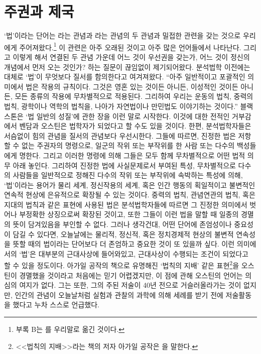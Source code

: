 \chapter{주권과 제국}

`법'이라는 단어는
라는 관념과
라는 관념의 두 관념과 밀접한 관련을 갖는 것으로
우리에게 주어져왔다.\footnote{%
  부록 B는 를
  우리말로 옮긴 것이다. }
이 관련은 아주 오래된 것이고
아주 많은 언어들에서 나타난다.
그리고 이렇게 해서 연결된 두 관념 가운데
어느 것이 우선권을 갖는가,
어느 것이 정신의 개념에서 먼저 오는 것인가?
하는 질문이 끊임없이 제기되어왔다.
분석법학 이전에는 대체로
`법'이 무엇보다 질서를 함의한다고 여겨져왔다.
``아주 일반적이고 포괄적인 의미에서 법은 작용의 규칙이다.
그것은 영혼 있는 것이든 아니든,
이성적인 것이든 아니든,
모든 종류의 작용에 무차별적으로 적용된다.
그리하여 우리는 운동의 법칙, 중력의 법칙, 광학이나 역학의 법칙을,
나아가 자연법이나 만민법도 이야기하는 것이다.''
블랙스톤은 `법 일반의 성질'에 관한 장을 이런 말로 시작한다.
이것에 대한 전적인 거부감에서
벤담과 오스틴은 법학자가 되었다고
할 수도 있을 것이다.
한편, 분석법학자들은 서슴없이 힘의 관념을 질서의 관념보다 우선시한다.
그들에 따르면,
진정한 법은 저항할 수 없는 주권자의 명령으로,
일군의 작위 또는 부작위를 한 사람 또는 다수의 백성들에게 명한다.
그리고
이러한 명령에 의해 그들은
모두 함께 무차별적으로
어떤 법적 의무 아래 놓인다.
그리하여
진정한 법에
사실문제로서
부여된 특성,
무차별적으로
다수의 사람들을
일반적으로 정해진
다수의 작위 또는 부작위에 속박하는 특성에 의해,
`법'이라는 용어가
물리 세계, 정신작용의 세계, 혹은 인간 행동의
획일적이고 불변적인 연속적 현상에
은유적으로 확장될 수 있는 것이다.
중력의 법칙, 관념연관의 법칙, 혹은 지대의 법칙과 같은 표현에 사용된
법은 분석법학자들에 따르면
그 진정한 의미에서 벗어나 부정확한 상징으로써 확장된 것이고,
또한 그들이 이런 법을 말할 때 일종의 경멸의 뜻이 담겨있음을 부인할 수 없다.
그러나 생각건대,
어떤 단어에 존엄성이나 중요성이 담길 수 있다면,
오늘날에는 물리적, 정신적, 혹은 정치경제적 현상의 불변적 연속성을
뜻할 때의 법이라는 단어보다 더 존엄하고 중요한 것이 또 있을까 싶다.
이런 의미에서의 `법'은 대부분의 근대사상에 들어와있고,
근대사상이 수행되는 조건이 되었다고 할 수 있을 정도이다.
아가일 공작의 책으로 유명해진
`법칙의 지배' 같은 표현\footnote{%
  <<법칙의 지배>>라는
  책의 저자 아가일 공작은
  을 말한다.
}을 오스틴이 경멸했을 것이라고 처음에는 믿기 어렵겠지만,
이 점에 관해
오스틴의 언어는
의심의 여지가 없다. 그는
또한, 그의 주된 저술이 40년 전으로 거슬러올라가는 것이 없지만,
인간의 관념이 오늘날처럼 실험과 관찰의 과학에 의해 세례를 받기 전에
저술활동을 했다고 누차 스스로 언급했다.

